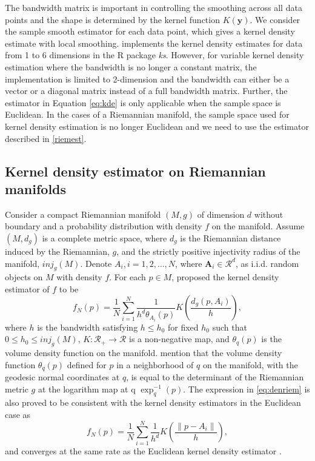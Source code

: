 \documentclass[11pt,a4paper,]{article}
\begin{document}
The bandwidth matrix is important in controlling the smoothing across all data points and the shape is determined by the kernel function \(K(\pmb{y})\). We consider the sample smooth estimator for each data point, which gives a kernel density estimate with local smoothing.
\textcite{Duong2007-up} implements the kernel density estimates for data from 1 to 6 dimensions in the R package \emph{ks}. However, for variable kernel density estimation where the bandwidth is no longer a constant matrix, the implementation is limited to 2-dimension and the bandwidth can either be a vector or a diagonal matrix instead of a full bandwidth matrix.
Further, the estimator in Equation \eqref{eq:kde} is only applicable when the sample space is Euclidean. In the cases of a Riemannian manifold, the sample space used for kernel density estimation is no longer Euclidean and we need to use the estimator described in \autoref{riemest}.

\hypertarget{riemest}{%
\subsection{Kernel density estimator on Riemannian manifolds}\label{riemest}}

Consider a compact Riemannian manifold \((M, g)\) of dimension \(d\) without boundary and a probability distribution with density \(f\) on the manifold. Assume \((M, d_g)\) is a complete metric space, where \(d_g\) is the Riemannian distance induced by the Riemannian, \(g\), and the strictly positive injectivity radius \autocite{Chavel2006-mp} of the manifold, \(inj_g(M)\).
Denote \(A_i, i = 1, 2, \dots, N\), where \(\pmb{A}_i \in \mathcal{R}^d\), as i.i.d. random objects on \(M\) with density \(f\). For each \(p\in M\), \textcite{Pelletier2005-vu} proposed the kernel density estimator of \(f\) to be
\begin{equation}
\label{eq:denriem}
f_N(p) = \frac{1}{N} \sum_{i=1}^{N} \frac{1}{h^d \theta_{A_i}(p)} K(\frac{d_g(p, A_i)}{h}),
\end{equation}
where \(h\) is the bandwidth satisfying \(h \leq h_0\) for fixed \(h_0\) such that \(0\leq h_0\leq inj_g(M)\), \(K: \mathcal{R}_{+} \rightarrow \mathcal{R}\) is a non-negative map, and \(\theta_{q}(p)\) is the volume density function on the manifold.
\textcite{Pelletier2005-vu} mention that the volume density function \(\theta_q(p)\) defined for \(p\) in a neighborhood of \(q\) on the manifold, with the geodesic normal coordinates at \(q\), is equal to the determinant of the Riemannian metric \(g\) at the logarithm map at q \(\exp_q^{-1}(p)\). The expression in \eqref{eq:denriem} is also proved to be consistent with the kernel density estimators in the Euclidean case as
\begin{equation}
\label{eq:denconsist}
f_N(p) = \frac{1}{N} \sum_{i=1}^{N} \frac{1}{h^d} K(\frac{\|p-A_i\|}{h}),
\end{equation}
and converges at the same rate as the Euclidean kernel density estimator \autocite{Henry2009-ll}.
\end{document}
